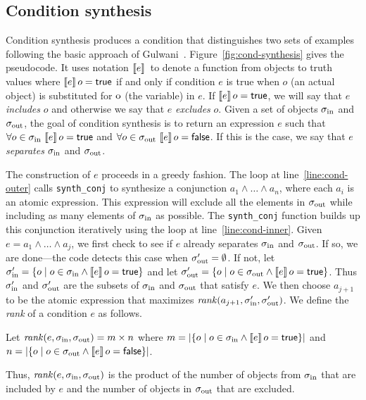 \documentclass[natbib,10pt]{sigplanconf}
\newcommand{\code}[1]{\lstinline|#1|\xspace}
\begin{document}
\subsection{Condition synthesis}

Condition synthesis produces a condition that distinguishes two
sets of examples following the basic approach of
Gulwani~\cite{Gulwani:popl:2011}.  
Figure~\ref{fig:cond-synthesis} gives the pseudocode.  It uses notation
$\llbracket e\rrbracket\,$ to denote a function from objects to truth values where
$\llbracket e\rrbracket\,o = \mathsf{true}$ if and only if condition $e$ is true when
$o$ (an actual object) is substituted for $\textrm{o}$ (the variable) in
$e$.  If $\llbracket e\rrbracket\,o = \mathsf{true}$, we will say that $e$
\emph{includes} $o$ and otherwise we say that $e$ \emph{excludes}
$o$.  Given a set of objects $\sigma_{\text{in}}$ and $\sigma_{\text{out}}$, the goal of
condition synthesis is to return an expression $e$ such that $\forall o \in \inset\ 
\sembrack{e}o = \true$ and $\forall o \in
\sigma_{\text{out}}\ \llbracket e\rrbracket\,o = \mathsf{false}$.  If this is the case, we say that
$e$ \emph{separates} $\sigma_{\text{in}}$ and $\sigma_{\text{out}}$.

The construction of $e$ proceeds in a greedy fashion.  The loop at
line~\ref{line:cond-outer} calls \code{synth_conj} to
synthesize a conjunction $a_1 \wedge \ldots \wedge a_n$, where each
$a_i$ is an atomic expression.  This expression will exclude all the elements in
$\sigma_{\text{out}}$ while including as many elements of $\sigma_{\text{in}}$ as possible.
The \code{synth_conj} function builds up this conjunction iteratively
using the loop at line~\ref{line:cond-inner}.
Given $e = a_1 \wedge \ldots \wedge a_j$, we first check to see if $e$
already separates $\sigma_{\text{in}}$ and $\sigma_{\text{out}}$.  If so, we are done---the
code detects this case when $\sigma_{\text{out}}' = \emptyset$.  If not, let $\sigma_{\text{in}}' =
\{o \mid o \in \sigma_{\text{in}} \wedge \llbracket e\rrbracket\,o = \mathsf{true}\}$ and let
$\sigma_{\text{out}}' = \{o \mid o \in \sigma_{\text{out}} \wedge \llbracket e\rrbracket\,o = \mathsf{true}\}$.
Thus $\sigma_{\text{in}}'$ and $\sigma_{\text{out}}'$ are the subsets of $\sigma_{\text{in}}$ and
$\sigma_{\text{out}}$ that satisfy $e$.  We then choose $a_{j+1}$ to be the atomic
expression that maximizes $\mathit{rank}(a_{j+1},\sigma_{\text{in}}',\sigma_{\text{out}}')$.  We
define the \emph{rank} of a condition $e$ as follows.
\begin{defn}
Let $\mathit{rank}(e,\sigma_{\text{in}},\sigma_{\text{out}}) = m \times n$ where $m = \lvert \{o
  \mid o \in \sigma_{\text{in}} \wedge \llbracket e\rrbracket\,o = \mathsf{true}\} \rvert$ and $n =
\lvert \{o \mid o \in \sigma_{\text{out}} \wedge \llbracket e\rrbracket\,o = \mathsf{false}\} \rvert$.
\end{defn}
Thus, $\mathit{rank}(e,\sigma_{\text{in}},\sigma_{\text{out}})$ is the product of the number of
objects from $\sigma_{\text{in}}$ that are included by $e$ and the number of
objects in $\sigma_{\text{out}}$ that are excluded.
\end{document}
